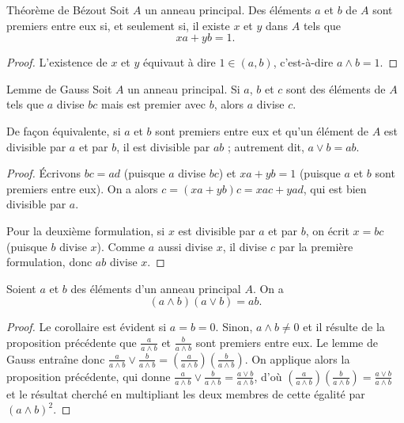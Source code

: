 \documentclass[]{report}
\begin{document}
\begin{tm}{Théorème de Bézout}{}
    Soit $A$ un anneau principal. Des éléments $a$ et $b$ de $A$ sont premiers entre eux si, et seulement si, il existe $x$ et $y$ dans $A$ tels que
    \[xa + yb = 1.\]
\end{tm}

\begin{proof}
    L'existence de $x$ et $y$ équivaut à dire $1 \in (a, b)$, c'est-à-dire $a \wedge b = 1$.
\end{proof}

\begin{prop}{Lemme de Gauss}{}
    Soit $A$ un anneau principal. Si $a$, $b$ et $c$ sont des éléments de $A$ tels que $a$ divise $bc$ mais est premier avec $b$, alors $a$ divise $c$.

    De façon équivalente, si $a$ et $b$ sont premiers entre eux et qu'un élément de $A$ est divisible par $a$ et par $b$, il est divisible par $ab$ ; autrement dit, $a \vee b = ab$.
\end{prop}

\begin{proof}
    Écrivons $bc = ad$ (puisque $a$ divise $bc$) et $xa + yb = 1$ (puisque $a$ et $b$ sont premiers entre eux). On a alors $c = (xa + yb)c = xac + yad$, qui est bien divisible par $a$.

    Pour la deuxième formulation, si $x$ est divisible par $a$ et par $b$, on écrit $x = bc$ (puisque $b$ divise $x$). Comme $a$ aussi divise $x$, il divise $c$ par la première formulation, donc $ab$ divise $x$.
\end{proof}

\begin{cor}{}{}
    Soient $a$ et $b$ des éléments d'un anneau principal $A$. On a
    \[(a \wedge b)(a \vee b) = ab.\]
\end{cor}

\begin{proof}
    Le corollaire est évident si $a = b = 0$. Sinon, $a \wedge b \neq 0$ et il résulte de la proposition précédente que $\frac{a}{a \wedge b}$ et $\frac{b}{a \wedge b}$ sont premiers entre eux. Le lemme de Gauss entraîne donc $\frac{a}{a \wedge b} \vee \frac{b}{a \wedge b} = \left(\frac{a}{a \wedge b}\right)\left(\frac{b}{a \wedge b}\right)$. On applique alors la proposition précédente, qui donne $\frac{a}{a \wedge b} \vee \frac{b}{a \wedge b} = \frac{a \vee b}{a \wedge b}$, d'où $\left(\frac{a}{a \wedge b}\right)\left(\frac{b}{a \wedge b}\right) = \frac{a \vee b}{a \wedge b}$ et le résultat cherché en multipliant les deux membres de cette égalité par $(a \wedge b)^2$.
\end{proof}
\end{document}
